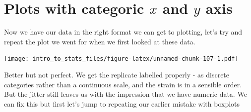 \documentclass[
]{book}
\newenvironment{Shaded}{\begin{snugshade}}{\end{snugshade}}
\newcommand{\DataTypeTok}[1]{\textcolor[rgb]{0.13,0.29,0.53}{#1}}
\newcommand{\KeywordTok}[1]{\textcolor[rgb]{0.13,0.29,0.53}{\textbf{#1}}}
\newcommand{\NormalTok}[1]{#1}
\newcommand{\OperatorTok}[1]{\textcolor[rgb]{0.81,0.36,0.00}{\textbf{#1}}}
\newcommand{\StringTok}[1]{\textcolor[rgb]{0.31,0.60,0.02}{#1}}
\begin{document}
\begin{Shaded}
\end{Shaded}

\hypertarget{plots-with-categoric-x-and-y-axis}{%
\section{\texorpdfstring{Plots with categoric \(x\) and \(y\) axis}{Plots with categoric x and y axis}}\label{plots-with-categoric-x-and-y-axis}}

Now we have our data in the right format we can get to plotting, let's try and repeat the plot we went for when we first looked at these data.

\begin{Shaded}
\end{Shaded}

\texttt{[image: intro\_to\_stats\_files/figure-latex/unnamed-chunk-107-1.pdf]}

Better but not perfect. We get the replicate labelled properly - as discrete categories rather than a continuous scale, and the strain is in a sensible order. But the jitter still leaves us with the impression that we have numeric data. We can fix this but first let's jump to repeating our earlier mistake with boxplots

\begin{Shaded}
\end{Shaded}
\end{document}
